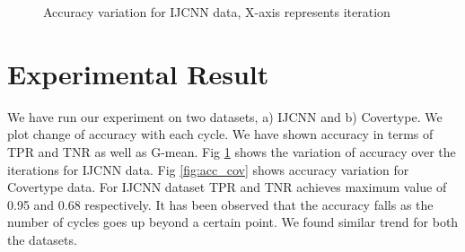 \documentclass{article} %
\begin{document}
\begin{figure}
\caption{Accuracy variation for IJCNN data, X-axis represents iteration}
\label{fig:acc_ijcnn}
\end{figure}

\section{Experimental Result}

We have run our experiment on two datasets, a) IJCNN and b) Covertype. We plot change of accuracy with each cycle. We have shown accuracy in terms of TPR and TNR as well as G-mean. Fig \ref{fig:acc_ijcnn} shows the variation of accuracy over the iterations for IJCNN data. Fig \ref{fig:acc_cov} shows accuracy variation for Covertype data. For IJCNN dataset TPR and TNR achieves maximum value of 0.95 and 0.68 respectively. It has been observed that the accuracy falls as the number of cycles goes up beyond a certain point. We found similar trend for both the datasets.
\end{document}
